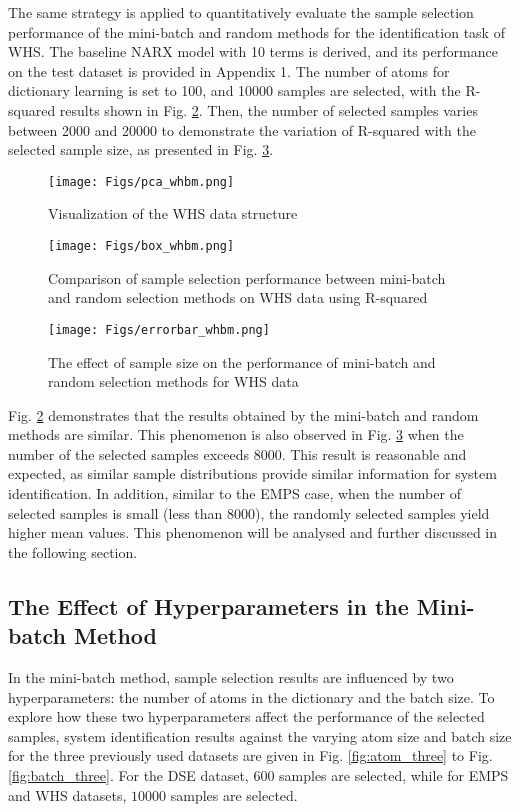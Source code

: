 \documentclass{article}
\begin{document}
The same strategy is applied to quantitatively evaluate the sample selection performance of the mini-batch and random methods for the identification task of WHS. 
The baseline NARX model with 10 terms is derived, and its performance on the test dataset is provided in Appendix 1.
The number of atoms for dictionary learning is set to 100, and 10000 samples are selected, with the R-squared results shown in Fig. \ref{fig:box_whbm}.
Then, the number of selected samples varies between 2000 and 20000 to demonstrate the variation of R-squared with the selected sample size, as presented in Fig. \ref{fig:errbar_whbm}.

\begin{figure}[htpb]
    \centering
    \texttt{[image: Figs/pca\_whbm.png]}
    \caption{Visualization of the WHS data structure}
    \label{fig:pca_whbm}
\end{figure}

\begin{figure}[htpb]
    \centering
    \texttt{[image: Figs/box\_whbm.png]}
    \caption{Comparison of sample selection performance between mini-batch and random selection methods on WHS data using R-squared}
    \label{fig:box_whbm}
\end{figure}

\begin{figure}[htpb]
    \centering
    \texttt{[image: Figs/errorbar\_whbm.png]}
    \caption{The effect of sample size on the performance of mini-batch and random selection methods for WHS data}
    \label{fig:errbar_whbm}
\end{figure}

Fig. \ref{fig:box_whbm} demonstrates that the results obtained by the mini-batch and random methods are similar. This phenomenon is also observed in Fig. \ref{fig:errbar_whbm} when the number of the selected samples exceeds 8000. 
This result is reasonable and expected, as similar sample distributions provide similar information for system identification.
In addition, similar to the EMPS case, when the number of selected samples is small (less than 8000), the randomly selected samples yield higher mean values. This phenomenon will be analysed and further discussed in the following section.

\subsection{The Effect of Hyperparameters in the Mini-batch Method}\label{sec:eff_hypers}
In the mini-batch method, sample selection results are influenced by two hyperparameters: the number of atoms in the dictionary and the batch size. 
To explore how these two hyperparameters affect the performance of the selected samples, system identification results against the varying atom size and batch size for the three previously used datasets are given in Fig. \ref{fig:atom_three} to Fig. \ref{fig:batch_three}.
For the DSE dataset, $600$ samples are selected, while for EMPS and WHS datasets, $10000$ samples are selected.
\end{document}
